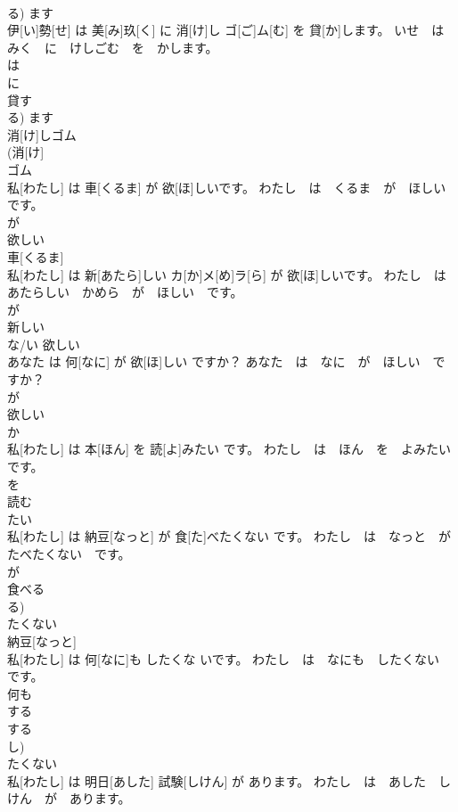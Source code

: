 \documentclass[8pt]{extreport}
\begin{document}
\begin{CJK}{UTF8}{min}
\\	る)	ます 
\\	伊[い]勢[せ] は 美[み]玖[く] に 消[け]し ゴ[ご]ム[む] を 貸[か]します。	いせ　は　みく　に　けしごむ　を　かします。	
\\	は 
\\	に 
\\	貸す 
\\	る)	ます 
\\	消[け]しゴム 
\\	(消[け] 
\\	ゴム 
\\	私[わたし] は 車[くるま] が 欲[ほ]しいです。	わたし　は　くるま　が　ほしいです。	
\\	が 
\\	欲しい 
\\	車[くるま] 
\\	私[わたし] は 新[あたら]しい カ[か]メ[め]ラ[ら] が 欲[ほ]しいです。	わたし　は　あたらしい　かめら　が　ほしい　です。	
\\	が 
\\	新しい 
\\	な/い	欲しい 
\\	あなた は 何[なに] が 欲[ほ]しい ですか？	あなた　は　なに　が　ほしい　ですか？	
\\	が 
\\	欲しい 
\\	か 
\\	私[わたし] は 本[ほん] を 読[よ]みたい です。	わたし　は　ほん　を　よみたい　です。	
\\	を 
\\	読む 
\\	たい 
\\	私[わたし] は 納豆[なっと] が 食[た]べたくない です。	わたし　は　なっと　が　たべたくない　です。	
\\	が 
\\	食べる 
\\	る)	
\\	たくない 
\\	納豆[なっと] 
\\	私[わたし] は 何[なに]も したくな いです。	わたし　は　なにも　したくない　です。	
\\	何も 
\\	する 
\\	する 
\\	し)	
\\	たくない 
\\	私[わたし] は 明日[あした] 試験[しけん] が あります。	わたし　は　あした　しけん　が　あります。	

\end{CJK}
\end{document}
